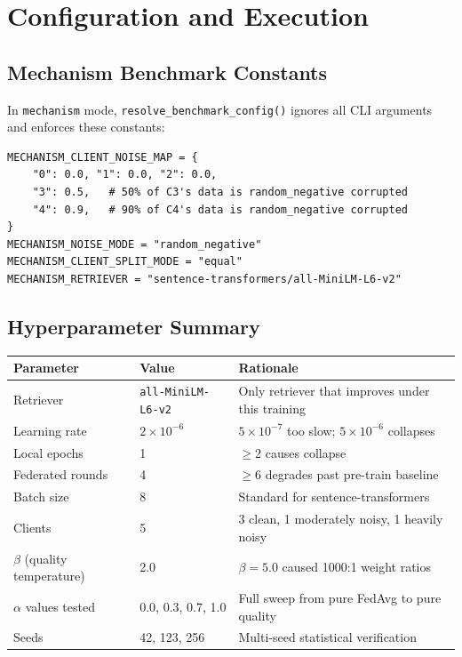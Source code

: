 \documentclass[12pt,a4paper]{article}
\begin{document}
\section{Configuration and Execution}

\subsection{Mechanism Benchmark Constants}

In \texttt{mechanism} mode, \texttt{resolve\_benchmark\_config()} ignores all CLI arguments and enforces these constants:

\begin{lstlisting}[caption={MECHANISM\_* constants in federated\_noisy\_qa.py}]
MECHANISM_CLIENT_NOISE_MAP = {
    "0": 0.0, "1": 0.0, "2": 0.0,
    "3": 0.5,   # 50% of C3's data is random_negative corrupted
    "4": 0.9,   # 90% of C4's data is random_negative corrupted
}
MECHANISM_NOISE_MODE = "random_negative"
MECHANISM_CLIENT_SPLIT_MODE = "equal"
MECHANISM_RETRIEVER = "sentence-transformers/all-MiniLM-L6-v2"
\end{lstlisting}

\subsection{Hyperparameter Summary}

\begin{center}
\renewcommand{\arraystretch}{1.4}
\begin{tabular}{lll}
\toprule
\textbf{Parameter} & \textbf{Value} & \textbf{Rationale} \\
\midrule
Retriever & \texttt{all-MiniLM-L6-v2} & Only retriever that improves under this training \\
Learning rate & $2\times10^{-6}$ & $5\times10^{-7}$ too slow; $5\times10^{-6}$ collapses \\
Local epochs & 1 & $\geq$2 causes collapse \\
Federated rounds & 4 & $\geq$6 degrades past pre-train baseline \\
Batch size & 8 & Standard for sentence-transformers \\
Clients & 5 & 3 clean, 1 moderately noisy, 1 heavily noisy \\
$\beta$ (quality temperature) & 2.0 & $\beta=5.0$ caused 1000:1 weight ratios \\
$\alpha$ values tested & 0.0, 0.3, 0.7, 1.0 & Full sweep from pure FedAvg to pure quality \\
Seeds & 42, 123, 256 & Multi-seed statistical verification \\
\bottomrule
\end{tabular}
\end{center}
\end{document}
